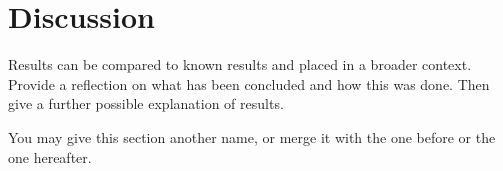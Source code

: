 \section{Discussion}
\label{sec:discussion}
Results can be compared to known results and placed in a broader context.
Provide a reflection on what has been concluded and how this was done.
Then give a further possible explanation of results.

You may give this section another name, or merge it with the one before or the one hereafter.